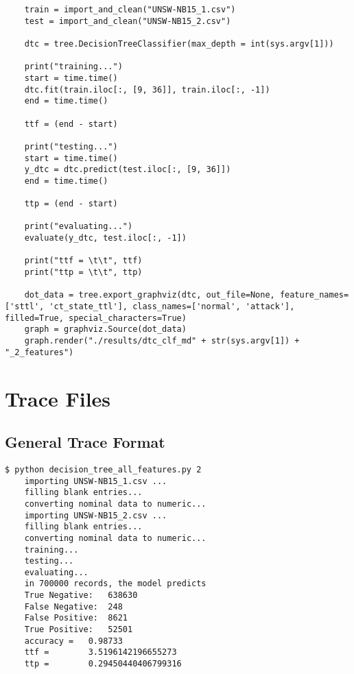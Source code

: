 \begin{appendix}
{\begin{verbatim}
    train = import_and_clean("UNSW-NB15_1.csv")
    test = import_and_clean("UNSW-NB15_2.csv")

    dtc = tree.DecisionTreeClassifier(max_depth = int(sys.argv[1]))

    print("training...")
    start = time.time()
    dtc.fit(train.iloc[:, [9, 36]], train.iloc[:, -1])
    end = time.time()

    ttf = (end - start)

    print("testing...")
    start = time.time()
    y_dtc = dtc.predict(test.iloc[:, [9, 36]])
    end = time.time()

    ttp = (end - start)

    print("evaluating...")
    evaluate(y_dtc, test.iloc[:, -1])

    print("ttf = \t\t", ttf)
    print("ttp = \t\t", ttp)

    dot_data = tree.export_graphviz(dtc, out_file=None, feature_names=['sttl', 'ct_state_ttl'], class_names=['normal', 'attack'], filled=True, special_characters=True)
    graph = graphviz.Source(dot_data)
    graph.render("./results/dtc_clf_md" + str(sys.argv[1]) + "_2_features")
\end{verbatim}

\chapter{Trace Files}

\section{General Trace Format}
\begin{verbatim}
$ python decision_tree_all_features.py 2
    importing UNSW-NB15_1.csv ...
    filling blank entries...
    converting nominal data to numeric...
    importing UNSW-NB15_2.csv ...
    filling blank entries...
    converting nominal data to numeric...
    training...
    testing...
    evaluating...
    in 700000 records, the model predicts
    True Negative:	 638630
    False Negative:	 248
    False Positive:	 8621
    True Positive:	 52501
    accuracy = 	 0.98733
    ttf = 		 3.5196142196655273
    ttp = 		 0.29450440406799316
\end{verbatim}

}
\end{appendix}
